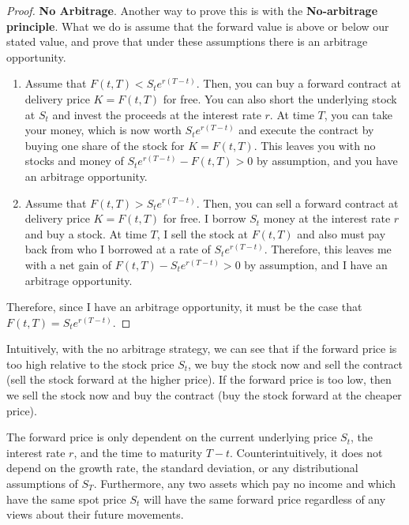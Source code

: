 \documentclass{article}
\begin{document}
    \begin{proof}
      \textbf{No Arbitrage}. Another way to prove this is with the \textbf{No-arbitrage principle}. What we do is assume that the forward value is above or below our stated value, and prove that under these assumptions there is an arbitrage opportunity. 
      \begin{enumerate}
        \item Assume that $F(t, T) < S_t e^{r (T - t)}$. Then, you can buy a forward contract at delivery price $K = F(t, T)$ for free. You can also short the underlying stock at $S_t$ and invest the proceeds at the interest rate $r$. At time $T$, you can take your money, which is now worth $S_t e^{r (T - t)}$ and execute the contract by buying one share of the stock for $K = F(t, T)$. This leaves you with no stocks and money of $S_t e^{r (T - t)} - F(t, T) > 0$ by assumption, and you have an arbitrage opportunity.
        \item Assume that $F(t, T) > S_t e^{r (T - t)}$. Then, you can sell a forward contract at delivery price $K = F(t, T)$ for free. I borrow $S_t$ money at the interest rate $r$ and buy a stock. At time $T$, I sell the stock at $F(t, T)$ and also must pay back from who I borrowed at a rate of $S_t e^{r (T - t)}$. Therefore, this leaves me with a net gain of $F(t, T) - S_t e^{r (T - t)} > 0$ by assumption, and I have an arbitrage opportunity.
      \end{enumerate}
      Therefore, since I have an arbitrage opportunity, it must be the case that $F(t, T) = S_t e^{r (T - t)}$.
    \end{proof}

    Intuitively, with the no arbitrage strategy, we can see that if the forward price is too high relative to the stock price $S_t$, we buy the stock now and sell the contract (sell the stock forward at the higher price). If the forward price is too low, then we sell the stock now and buy the contract (buy the stock forward at the cheaper price). 

    \begin{corollary}
      The forward price is only dependent on the current underlying price $S_t$, the interest rate $r$, and the time to maturity $T - t$. Counterintuitively, it does not depend on the growth rate, the standard deviation, or any distributional assumptions of $S_T$. Furthermore, any two assets which pay no income and which have the same spot price $S_t$ will have the same forward price regardless of any views about their future movements. 
    \end{corollary}
\end{document}
